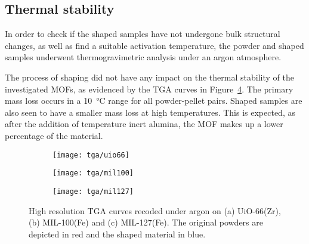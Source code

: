 
\subsection{Thermal stability}

In order to check if the shaped samples have not undergone bulk
structural changes, as well as find a suitable activation temperature,
the powder and shaped samples underwent thermogravimetric analysis
under an argon atmosphere.

The process of shaping did not have any impact on the thermal stability of 
the investigated MOFs, as evidenced by the TGA curves in
Figure~\ref{fig:shaping:tgacurves}. The primary mass loss occurs 
in a \SI{10}{\degreeCelsius} range for all powder-pellet pairs.
Shaped samples are also seen to have a smaller mass loss
at high temperatures. This is expected, as after the addition of 
temperature inert alumina, the MOF makes up a lower percentage of
the material.

\begin{figure}
    \centering
    
    \begin{subfigure}{0.6\textwidth}
        \parbox[c]{0.1\linewidth}{\caption{}\label{fig:shaping:tgauio66}}%
        \parbox[b]{0.7\linewidth}{%
        \texttt{[image: tga/uio66]}%
        }%
    \end{subfigure}

    \begin{subfigure}{0.6\textwidth}
        \parbox[c]{0.1\linewidth}{\caption{}\label{fig:shaping:tgamil100}}%
        \parbox[b]{0.7\linewidth}{%
        \texttt{[image: tga/mil100]}%
        }%
    \end{subfigure}

    \begin{subfigure}{0.6\textwidth}
        \parbox[c]{0.1\linewidth}{\caption{}\label{fig:shaping:tgamil127}}%
        \parbox[b]{0.7\linewidth}{%
        \texttt{[image: tga/mil127]}%
        }%
    \end{subfigure}
    
    \caption{High resolution TGA curves recoded under argon 
    on (a) UiO-66(Zr), (b) MIL-100(Fe) and (c) MIL-127(Fe). The 
    original powders are depicted in red and the shaped material
    in blue.}%
    \label{fig:shaping:tgacurves}

\end{figure}
